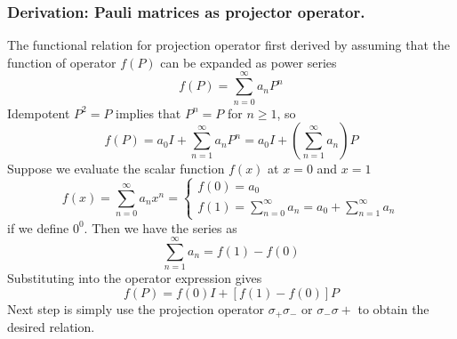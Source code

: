 \documentclass[../../../main.tex]{subfiles}
\begin{document}
\subsubsection{Derivation: Pauli matrices as projector operator.}
The functional relation for projection operator first derived by assuming that the function of operator $f(P)$ can be expanded as power series
\begin{equation*}
    f(P) = \sum_{n=0}^{\infty} a_n P^n
\end{equation*}
Idempotent $P ^{2 }= P$ implies that $P ^{n }=P$ for $n \geq1$, so
\begin{equation*}
    f(P) = a_0 I + \sum_{n=1}^{\infty} a_n P^n = a_0 I + \left( \sum_{n=1}^{\infty} a_n  \right)  P
\end{equation*}
Suppose we evaluate the scalar function $f(x)$ at $x=0$ and $x=1$
\begin{equation*}
    f(x) = \sum_{n=0}^{\infty} a_n x^n =
    \begin{cases}
        f(0) = a_0 \\
        f(1) = \sum_{n=0}^{\infty} a_n = a_0 + \sum_{n=1}^{\infty} a_n
    \end{cases}
\end{equation*}
if we define $0 ^{0}$.
Then we have the series as
\begin{equation*}
    \sum_{n=1}^{\infty} a_n = f(1) - f(0)
\end{equation*}
Substituting into the operator expression gives
\begin{equation*}
    f(P) = f(0)I + [f(1) - f(0)]P
\end{equation*}
Next step is simply use the projection operator $\sigma_+\sigma_-$ or $\sigma_-\sigma+$ to obtain the desired relation.
\end{document}
